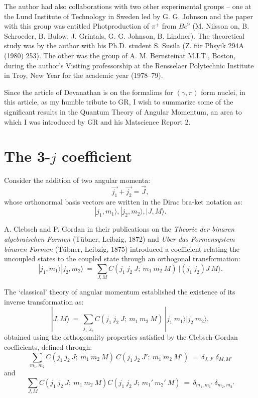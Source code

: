 The author had also collaborations with two other experimental groups -- one at the Lund Institute of Technology in Sweden led by G. G. Johnson and the paper with this group was  entitled Photproduction of $\pi^+$ from $Be^9$ (M. Nilsson on, B. Schroeder, B. Bulow, J. Grintals, G. G. Johnson, B. Lindner). The theoretical study was by the author with his Ph.D. student S. Susila (Z. für Phsyik 294A (1980) 253). The other was the group of A. M. Bernsteinat M.I.T., Boston, during the author's Visiting professorship at the Rensselaer Polytechnic Institute in Troy, New Year for the academic year (1978--79).

Since the article of Devanathan is on the formalims for $(\gamma,\pi)$ form nuclei, in this article, as my humble tribute to GR, I wish to summarize some of the significant results in the Quantum Theory of Angular Momentum, an area to which I was introduced by GR and his Matscience Report 2.

\section*{The 3-$j$ coefficient}

Consider the addition of two angular momenta:
\makeatletter
{}
\makeatother
\begin{equation}
\vec{j_1} + \vec{j_2} = \vec{J}, \label{chap29-eq1} 
\end{equation}
whose orthonormal basis vectors are written in the Dirac bra-ket notation as:
\begin{equation} 
|j_1,m_1\rangle , |j_2,m_2\rangle, |J,M\rangle. \label{chap29-eq2}
\end{equation}

A. Clebsch and P. Gordan in their publications on the \textit{Theorie der binaren algebraischen Formen} (Tübner, Leibzig, 1872) and \textit{Uber das Formensystem binaren Formen} (Tübner, Leibzig, 1875) introduced a coefficient relating the uncoupled states to the coupled state through an orthogonal transformation:
\begin{equation}
|j_1,m_1\rangle|j_2,m_2\rangle\ =\ \sum_{J,M} C(j_1\ j_2\ J;\ m_1\ m_2\ M)\ |(j_1\ j_2)J\ M\rangle. \label{chap29-eq3}
\end{equation}

The `classical' theory of angular momentum established the existence of its inverse transformation as:
\begin{equation}
|J,M\rangle\ =\ \sum_{j_1,j_2} C(j_1\ j_2\ J;\ m_1\ m_2\ M)\ |j_1\ m_1\rangle |j _2\  m_2\rangle, \label{chap29-eq4}
\end{equation}
obtained using the orthogonality properties satisfied by the Clebsch-Gordan coefficients, defined through:
\begin{equation}
\sum_{m_1,m_2} C(j_1\ j_2\ J;\ m_1\ m_2\ M)\ C(j_1\ j_2\ J';\ m_1\ m_2\ M')\ =\ \delta_{J,J'}\ \delta_{M,M'} \label{chap29-eq5}
\end{equation}
and
\begin{equation}
\sum_{J,M} C(j_1\ j_2\ J;\ m_1\ m_2\ M)C(j_1\ j_2\ J;\ m_1'\ m_2'\ M)\ =\ \delta_{m_1,m_1'} \ \delta_{m_2,m_2'} \label{chap29-eq6}
\end{equation}

